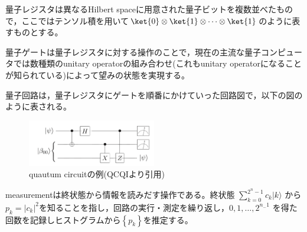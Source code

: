 \documentclass[b5paper,papersize,dvipdfmx,fleqn]{jsarticle}
\begin{document}
量子レジスタは異なるHilbert spaceに用意された量子ビットを複数並べたもので，ここではテンソル積を用いて$\ket{0}\otimes \ket{1}\otimes \cdots \otimes \ket{1}$のように表すものとする。

量子ゲートは量子レジスタに対する操作のことで，現在の主流な量子コンピュータでは数種類のunitary operatorの組み合わせ(これもunitary operatorになることが知られている)によって望みの状態を実現する。

量子回路は，量子レジスタにゲートを順番にかけていった回路図で，以下の図のように表される。
\begin{center}
  \begin{figure}[H]
    \centering
       \includegraphics[width=0.5\textwidth]{circuit.pdf}
       \caption{quautum circuitの例(QCQIより引用)}
       \label{circuit}
  \end{figure}
\end{center}

measurementは終状態から情報を読みだす操作である。終状態 $\sum_{k=0}^{2^{n}-1} c_{k}|k\rangle$ から $p_{k}=\left|c_{k}\right|^{2}$を知ることを指し，回路の実行・測定を繰り返し，$0,1, \ldots, 2^{n_{-} 1}$ を得た回数を記録しヒストグラムから$\left\{p_{k}\right\}$を推定する。
\end{document}
